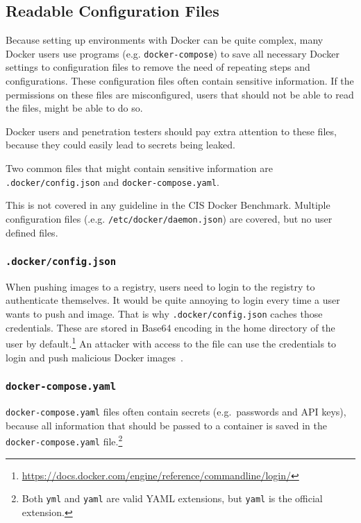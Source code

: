 \subsection{Readable Configuration Files}\label{subsection:config-files}
Because setting up environments with Docker can be quite complex, many Docker users use programs (e.g. \lstinline{docker-compose}) to save all necessary Docker settings to configuration files to remove the need of repeating steps and configurations. These configuration files often contain sensitive information. If the permissions on these files are misconfigured, users that should not be able to read the files, might be able to do so.

Docker users and penetration testers should pay extra attention to these files, because they could easily lead to secrets being leaked.

\medskip

Two common files that might contain sensitive information are \lstinline{.docker/config.json} and \lstinline{docker-compose.yaml}.

\medskip

This is not covered in any guideline in the CIS Docker Benchmark. Multiple configuration files (.e.g. \lstinline{/etc/docker/daemon.json}) are covered, but no user defined files.

\subsubsection{\texorpdfstring{\lstinline{.docker/config.json}}{.docker/config.json}}\label{config-files:docker-config-json}
When pushing images to a registry, users need to login to the registry to authenticate themselves.
It would be quite annoying to login every time a user wants to push and image. That is why \lstinline{.docker/config.json} caches those credentials. These are stored in Base64 encoding in the home directory of the user by default.\footnote{\url{https://docs.docker.com/engine/reference/commandline/login/}} An attacker with access to the file can use the credentials to login and push malicious Docker images~\cite{Docker-Credentials-Metasploit}.

\subsubsection{\texorpdfstring{\lstinline{docker-compose.yaml}}{docker-compose.yaml}}
\lstinline{docker-compose.yaml} files often contain secrets (e.g.\ passwords and API keys), because all information that should be passed to a container is saved in the \lstinline{docker-compose.yaml} file.\footnote{Both \lstinline{yml} and \lstinline{yaml} are valid YAML extensions, but \lstinline{yaml} is the official extension.}
